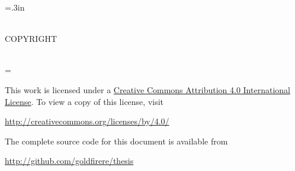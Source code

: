\thispagestyle{empty}
\begin{pagecentered}
\doublespaced
\parskip=.3in

\Title \\
COPYRIGHT \\
\Year \\
\Author \bigskip

\singlespaced
\parskip=\oldparskip

This work is licensed under a
\href{http://creativecommons.org/licenses/by/4.0/}{Creative Commons
  Attribution 4.0 International License}.  To view a copy of this
license, visit \bigskip

\url{http://creativecommons.org/licenses/by/4.0/} \bigskip

The complete source code for this document is available from \bigskip

\url{http://github.com/goldfirere/thesis}
\end{pagecentered}

